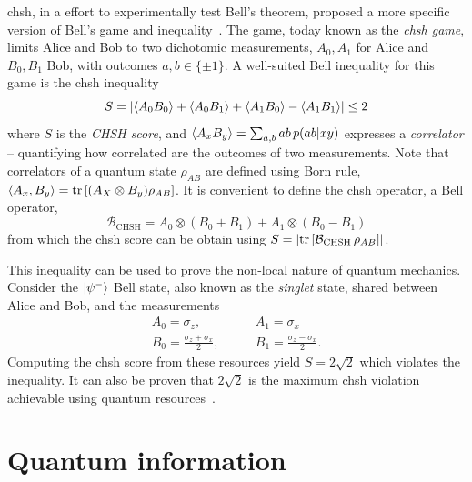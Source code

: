 \acrfull{chsh}, in a effort to experimentally test Bell's theorem, proposed a more specific version of Bell's game and inequality~\cite{Clauser1969}.
The game, today known as the \textit{\acrshort{chsh} game}, limits Alice and Bob to two dichotomic measurements, $A_0,A_1$ for Alice and $B_0,B_1$ Bob, with outcomes $a,b\in\{\pm 1\}$. 
A well-suited Bell inequality for this game is the \acrshort{chsh} inequality 
\begin{equation}
	S = \left | \langle {A_0 B_0} \rangle + \langle {A_0 B_1} \rangle + \langle {A_1 B_0} \rangle - \langle {A_1 B_1} \rangle  \right | \leq 2
	\label{eq:CHSH}
\end{equation}
where $S$ is the \textit{CHSH score}, and $\langle {A_x B_y} \rangle = \sum_{a,b} ab\,p(ab|xy)$ expresses a \textit{correlator} -- quantifying how correlated are the outcomes of two measurements.
Note that correlators of a quantum state $\rho_{AB}$ are defined using Born rule, $\mean{A_x,B_y} = \trr{(A_X \otimes B_y)\rho_{AB}}$.
It is convenient to define the \acrshort{chsh} operator, a Bell operator,
\begin{equation}
	\mathcal{B}_{\mathrm{CHSH}} = A_0 \otimes \left( B_0 + B_1 \right) + A_1 \otimes \left( B_0 - B_1 \right)
	\label{eq:CHSH_operator}
\end{equation}
from which the \acrshort{chsh} score can be obtain using $S = \left| \trr{\mathcal{B}_\mathrm{CHSH}\, \rho_{AB} } \right|$.

\medbreak

This inequality can be used to prove the non-local nature of quantum mechanics. 
Consider the $\ket{\psi^-}$ Bell state, also known as the \textit{singlet} state, shared between Alice and Bob, and the measurements
\begin{equation}
	\begin{split}
		A_0 = \sigma_z, \quad & \quad A_1 = \sigma_x \\
		B_0 = \frac{\sigma_z+\sigma_x}{2}, \quad &\quad B_1 = \frac{\sigma_z - \sigma_x}{2}.
		\label{eq:CHSH_measurement}
	\end{split}
\end{equation}
Computing the \acrshort{chsh} score from these resources yield $S=2\sqrt{2}$ which violates the inequality.
It can also be proven that $2\sqrt{2}$ is the maximum \acrshort{chsh} violation achievable using quantum resources~\cite{Tsirelson1980}.

\chapter{Quantum information}
\label{chapter:quantumInfo}

